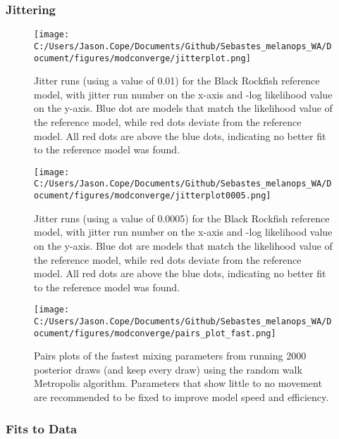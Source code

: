\documentclass[11pt,
  english,
  letterpaper,
]{article}
\begin{document}
\hypertarget{jittering}{%
\subsubsection{Jittering}\label{jittering}}

\begin{figure}
\centering
\texttt{[image: C:/Users/Jason.Cope/Documents/Github/Sebastes\_melanops\_WA/Document/figures/modconverge/jitterplot.png]}
\caption{Jitter runs (using a value of 0.01) for the Black Rockfish reference model, with jitter run number on the x-axis and -log likelihood value on the y-axis. Blue dot are models that match the likelihood value of the reference model, while red dots deviate from the reference model. All red dots are above the blue dots, indicating no better fit to the reference model was found.\label{fig:jitter}}
\end{figure}

\begin{figure}
\centering
\texttt{[image: C:/Users/Jason.Cope/Documents/Github/Sebastes\_melanops\_WA/Document/figures/modconverge/jitterplot0005.png]}
\caption{Jitter runs (using a value of 0.0005) for the Black Rockfish reference model, with jitter run number on the x-axis and -log likelihood value on the y-axis. Blue dot are models that match the likelihood value of the reference model, while red dots deviate from the reference model. All red dots are above the blue dots, indicating no better fit to the reference model was found.\label{fig:jitter0005}}
\end{figure}

\begin{figure}
\centering
\texttt{[image: C:/Users/Jason.Cope/Documents/Github/Sebastes\_melanops\_WA/Document/figures/modconverge/pairs\_plot\_fast.png]}
\caption{Pairs plots of the fastest mixing parameters from running 2000 posterior draws (and keep every draw) using the random walk Metropolis algorithm. Parameters that show little to no movement are recommended to be fixed to improve model speed and efficiency.\label{fig:pairs_plot_fast}}
\end{figure}

\clearpage

\hypertarget{fits-to-data}{%
\subsubsection{Fits to Data}\label{fits-to-data}}
\end{document}
